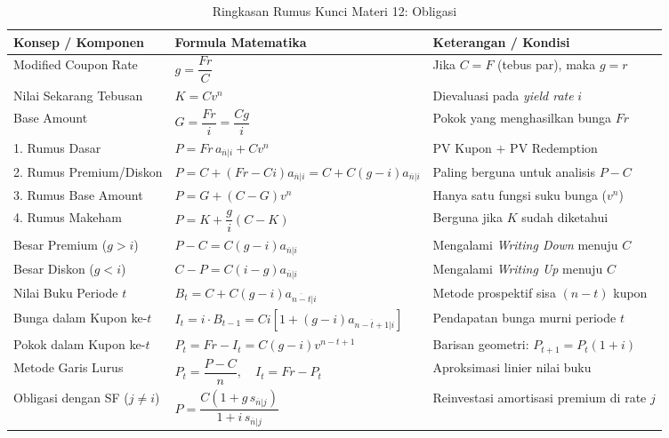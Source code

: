 \documentclass[11pt,a4paper]{article}
\begin{document}
\begin{table}[htbp]
\centering
\footnotesize
\setlength{\tabcolsep}{4pt}
\renewcommand{\arraystretch}{1.35}
\caption{Ringkasan Rumus Kunci Materi 12: Obligasi}
\vspace{0.5em}
\begin{tabular}{lll}
\toprule
\textbf{Konsep / Komponen} & \textbf{Formula Matematika} & \textbf{Keterangan / Kondisi} \\
\midrule
Modified Coupon Rate & $g = \dfrac{Fr}{C}$ & Jika $C = F$ (tebus par), maka $g = r$ \\
Nilai Sekarang Tebusan & $K = C v^n$ & Dievaluasi pada \textit{yield rate} $i$ \\
Base Amount & $G = \dfrac{Fr}{i} = \dfrac{Cg}{i}$ & Pokok yang menghasilkan bunga $Fr$ \\
1. Rumus Dasar & $P = Fr \, a_{\overline{n}|i} + C v^n$ & PV Kupon $+$ PV Redemption \\
2. Rumus Premium/Diskon & $P = C + (Fr - Ci)a_{\overline{n}|i} = C + C(g - i)a_{\overline{n}|i}$ & Paling berguna untuk analisis $P - C$ \\
3. Rumus Base Amount & $P = G + (C - G)v^n$ & Hanya satu fungsi suku bunga ($v^n$) \\
4. Rumus Makeham & $P = K + \dfrac{g}{i}(C - K)$ & Berguna jika $K$ sudah diketahui \\
Besar Premium ($g > i$) & $P - C = C(g - i)a_{\overline{n}|i}$ & Mengalami \textit{Writing Down} menuju $C$ \\
Besar Diskon ($g < i$) & $C - P = C(i - g)a_{\overline{n}|i}$ & Mengalami \textit{Writing Up} menuju $C$ \\
Nilai Buku Periode $t$ & $B_t = C + C(g - i)a_{\overline{n-t}|i}$ & Metode prospektif sisa $(n-t)$ kupon \\
Bunga dalam Kupon ke-$t$ & $I_t = i \cdot B_{t-1} = C i [1 + (g - i)a_{\overline{n-t+1}|i}]$ & Pendapatan bunga murni periode $t$ \\
Pokok dalam Kupon ke-$t$ & $P_t = Fr - I_t = C(g - i)v^{n-t+1}$ & Barisan geometri: $P_{t+1} = P_t(1+i)$ \\
Metode Garis Lurus & $P_t = \dfrac{P - C}{n}, \quad I_t = Fr - P_t$ & Aproksimasi linier nilai buku \\
Obligasi dengan SF ($j \neq i$) & $P = \dfrac{C(1 + g \, s_{\overline{n}|j})}{1 + i \, s_{\overline{n}|j}}$ & Reinvestasi amortisasi premium di rate $j$ \\
\bottomrule
\end{tabular}
\end{table}
\end{document}
